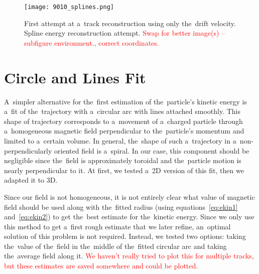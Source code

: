 		\begin{figure}
			\centering
			\texttt{[image: 9010\_splines.png]}
			\caption{First attempt at a~track reconstruction using only the~drift velocity. Spline energy reconstruction attempt. \textcolor{red}{Swap for better image(s) -- subfigure environment., correct coordinates.}}
			\label{fig:9010splines}
		\end{figure}
	
	\section{Circle and Lines Fit}
	\label{sec:clines}
		A~simpler alternative for the~first estimation of the~particle's kinetic energy is a~fit of the~trajectory with a~circular arc with lines attached smoothly. This shape of trajectory corresponds to a~movement of a~charged particle through a~homogeneous magnetic field perpendicular to the~particle's momentum and limited to a~certain volume. In general, the~shape of such a~trajectory in a~non-perpendicularly oriented field is a~spiral. In our case, this component should be negligible since the~field is approximately toroidal and the~particle motion is nearly perpendicular to it. At first, we tested a~2D version of this fit, then we adapted it to 3D.
		
		Since our field is not homogeneous, it is not entirely clear what value of magnetic field should be used along with the~fitted radius (using equations~\ref{eq:ekin1} and~\ref{eq:ekin2}) to get the~best estimate for the~kinetic energy. Since we only use this method to get a~first rough estimate that we later refine, an~optimal solution of this problem is not required. Instead, we tested two options: taking the~value of the~field in the~middle of the~fitted circular arc and taking the~average field along it. \textcolor{red}{We haven't really tried to plot this for multiple tracks, but these estimates are saved somewhere and could be plotted.}
		
